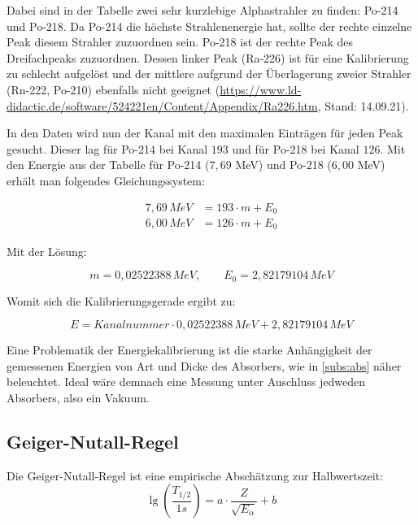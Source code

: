 
Dabei sind in der Tabelle zwei sehr kurzlebige Alphastrahler zu finden: Po-214 und Po-218. Da Po-214 die höchste Strahlenenergie hat, 
sollte der rechte einzelne Peak diesem Strahler zuzuordnen sein. Po-218 ist der rechte Peak des Dreifachpeaks zuzuordnen. Dessen 
linker Peak (Ra-226) ist für eine Kalibrierung zu schlecht aufgelöst und der mittlere aufgrund der Überlagerung zweier Strahler 
(Rn-222, Po-210) ebenfalls nicht geeignet
(\url{https://www.ld-didactic.de/software/524221en/Content/Appendix/Ra226.htm}, Stand: 14.09.21).

In den Daten wird nun der Kanal mit den maximalen Einträgen für jeden Peak gesucht. Dieser lag für Po-214 bei Kanal $193$ und 
für Po-218 bei Kanal $126$. Mit den Energie aus der Tabelle für Po-214 ($7,69$ MeV) und Po-218 ($6,00$ MeV) erhält man folgendes 
Gleichungssystem:

\begin{align*}{}
    7,69 \, MeV &= 193 \cdot m + E_0 \\
    6,00 \, MeV &= 126 \cdot m + E_0
\end{align*}

Mit der Lösung:

\begin{equation*}
    m = 0,02522388 \, MeV, \qquad E_0 = 2,82179104 \, MeV
\end{equation*}

Womit sich die Kalibrierungsgerade ergibt zu:

\begin{equation}
    E = Kanalnummer \cdot 0,02522388 \, MeV + 2,82179104 \, MeV
\end{equation}

Eine Problematik der Energiekalibrierung ist die starke Anhängigkeit der gemessenen Energien von Art und Dicke des Absorbers, wie in 
\ref{subs:abs} näher beleuchtet. Ideal wäre demnach eine Messung unter Auschluss jedweden Absorbers, also ein Vakuum.\\

\subsection{Geiger-Nutall-Regel}

Die Geiger-Nutall-Regel ist eine empirische Abschätzung zur Halbwertszeit:\\
\begin{equation}
    \lg (\frac{T_{1/2}}{1s}) = a \cdot \frac{Z}{\sqrt{E_{\alpha}}} + b
    \label{eq:gnr}
\end{equation}


